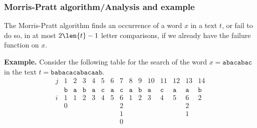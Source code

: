 %
\begin{frame}
\frametitle{Morris-Pratt algorithm/Analysis and example}

The Morris-Pratt algorithm finds an occurrence of a word \(x\) in a
text \(t\), or fail to do so, in at most \(2\len{t} - 1\) letter
comparisons, if we already have the failure function on \(x\).

\bigskip

\textbf{Example.} Consider the following table for the search of the
word \(x=\texttt{abacabac}\) in the text
\(t=\texttt{babacacabacaab}\).
\[
\begin{array}{c|cccccccccccccc|}
j & 1 & 2 & 3 & 4 & 5 & 6 & 7 & 8 & 9 & 10 & 11 & 12 & 13 & 14\\
  & \texttt{b} & \texttt{a} & \texttt{b} & \texttt{a} & \texttt{c} 
  & \texttt{a} & \texttt{c} & \texttt{a} & \texttt{b} & \texttt{a} 
  & \texttt{c} & \texttt{a} & \texttt{a} & \texttt{b}\\
\hline
i & 1 & 1 & 2 & 3 & 4 & 5 & 6 & 1 & 2 & 3 & 4 & 5 & 6 & 2 \\
  & 0 &   &   &   &   &   & 2 &   &   &   &   &   & 2 &   \\
  &   &   &   &   &   &   & 1 &   &   &   &   &   & 1 &   \\
  &   &   &   &   &   &   & 0 &   &   &   &   &   &   &  
\end{array}
\]

\end{frame}

